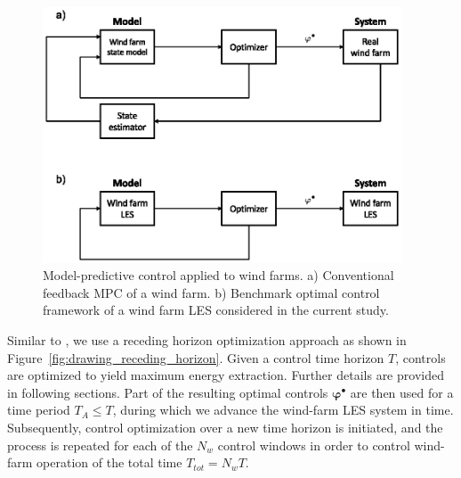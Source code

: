 \begin{figure}
	\centering
	\includegraphics[width=0.95\textwidth]{chapters/optimal_control_problem/figure1.eps}
	\caption[Model-predictive control approach applied to wind farms. Conventional MPC \& Benchmark optimal control framework applied in the current study.]{Model-predictive control applied to wind farms. a) Conventional feedback MPC of a wind farm. b) Benchmark optimal control framework of a wind farm LES considered in the current study.}\label{fig:block_diag}
\end{figure}

Similar to \cite{goit2015optimal}, we use a receding horizon optimization approach as shown in Figure~\ref{fig:drawing_receding_horizon}. Given a control time horizon $T$, controls are optimized to yield maximum energy extraction. Further details are provided in following sections. Part of the resulting optimal controls $\boldsymbol{\varphi}^{\bullet}$ are then used for a time period $T_A \leq T$, during which we advance the wind-farm LES system in time. Subsequently, control optimization over a new time horizon is initiated, and the process is repeated for each of the $N_w$ control windows in order to control wind-farm operation of the total time $T_{tot} = N_w T$. 

